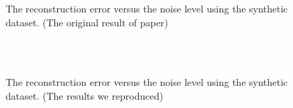 \documentclass{article}
\begin{document}
{\begin{figure}[htbp]
	\caption{ The reconstruction error versus the noise level using the synthetic dataset. (The original result of paper)}
\end{figure}
\begin{figure}[htbp]
	\label{fig2}
	\centering
	\quad\quad
	\\
	\quad\quad
	\\
	\caption{ The reconstruction error versus the noise level using the synthetic dataset. (The results we reproduced)}
\end{figure}

}
\end{document}
